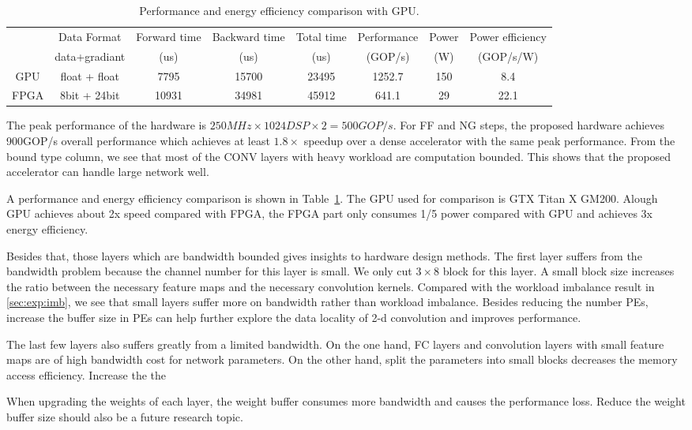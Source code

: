 \begin{table}[tb]
  \centering
  \caption{Performance and energy efficiency comparison with GPU. }
    \begin{tabular}{|c|c|c|c|c|c|c|c|}
    \hline
          & Data Format & Forward time & Backward time & Total time & Performance & Power & Power efficiency \bigstrut[t]\\
          & data+gradiant & (us)  & (us)  & (us)  & (GOP/s) & (W)   & (GOP/s/W) \bigstrut[b]\\
    \hline
    GPU   & float + float & 7795  & 15700  & 23495  & 1252.7  & 150   & 8.4  \bigstrut\\
    \hline
    FPGA  & 8bit + 24bit & 10931  & 34981  & 45912  & 641.1  & 29    & 22.1  \bigstrut\\
    \hline
    \end{tabular}%
  \label{tab:exp_comp}%
\end{table}%

The peak performance of the hardware is $250MHz \times 1024DSP \times 2 = 500GOP/s$. For FF and NG steps, the proposed hardware achieves 900GOP/s overall performance which achieves at least $1.8\times$ speedup over a dense accelerator with the same peak performance. From the bound type column, we see that most of the CONV layers with heavy workload are computation bounded. This shows that the proposed accelerator can handle large network well.

A performance and energy efficiency comparison is shown in Table~\ref{tab:exp_comp}. The GPU used for comparison is GTX Titan X GM200. Alough GPU achieves about 2x speed compared with FPGA, the FPGA part only consumes 1/5 power compared with GPU and achieves 3x energy efficiency.

Besides that, those layers which are bandwidth bounded gives insights to hardware design methods. The first layer suffers from the bandwidth problem because the channel number for this layer is small. We only cut $3\times 8$ block for this layer. A small block size increases the ratio between the necessary feature maps and the necessary convolution kernels. Compared with the workload imbalance result in \ref{sec:exp:imb}, we see that small layers suffer more on bandwidth rather than workload imbalance. Besides reducing the number PEs, increase the buffer size in PEs can help further explore the data locality of 2-d convolution and improves performance. 

The last few layers also suffers greatly from a limited bandwidth. On the one hand, FC layers and convolution layers with small feature maps are of high bandwidth cost for network parameters. On the other hand, split the parameters into small blocks decreases the memory access efficiency. Increase the the 

When upgrading the weights of each layer, the weight buffer consumes more bandwidth and causes the performance loss. Reduce the weight buffer size should also be a future research topic. 





